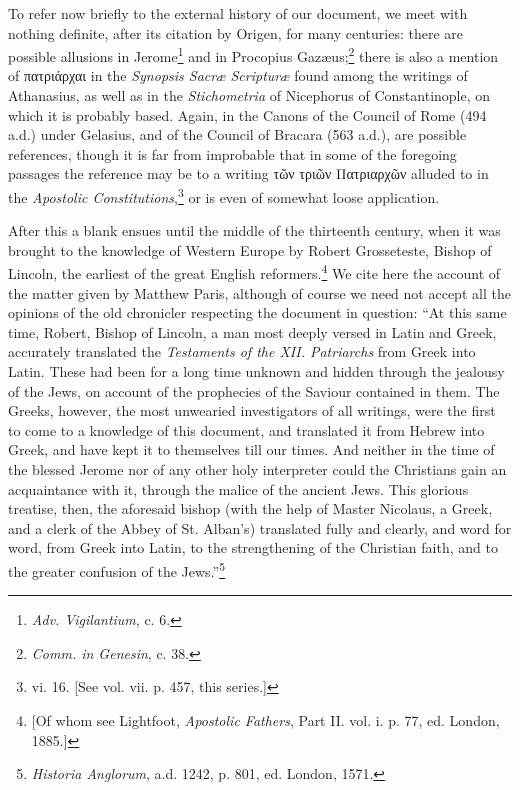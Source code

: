 To refer now briefly to the external history of our document, we meet with nothing definite, after its citation by Origen, for many centuries: there are possible allusions in Jerome\footnote{\emph{Adv. Vigilantium}, c. 6.} and in Procopius Gazæus;\footnote{\emph{Comm. in Genesin}, c. 38.} there is also a mention of \textgreek{πατριάρχαι} in the \emph{Synopsis Sacræ Scripturæ} found among the writings of Athanasius, as well as in the \emph{Stichometria} of Nicephorus of Constantinople, on which it is probably based. Again, in the Canons of the Council of Rome (494 a.d.) under Gelasius, and of the Council of Bracara (563 a.d.), are possible references, though it is far from improbable that in some of the foregoing passages the reference may be to a writing \textgreek{τῶν τριῶν Πατριαρχῶν} alluded to in the \emph{Apostolic Constitutions},\footnote{vi. 16. [See vol. vii. p. 457, this series.]} or is even of somewhat loose application.

After this a blank ensues until the middle of the thirteenth century, when it was brought to the knowledge of Western Europe by Robert Grosseteste, Bishop of Lincoln, the earliest of the great English reformers.\footnote{[Of whom see Lightfoot, \emph{Apostolic Fathers}, Part II. vol. i. p. 77, ed. London, 1885.]} We cite here the account of the matter given by Matthew Paris, although of course we need not accept all the opinions of the old chronicler respecting the document in question: “At this same time, Robert, Bishop of Lincoln, a man most deeply versed in Latin and Greek, accurately translated the \emph{Testaments of the XII. Patriarchs} from Greek into Latin. These had been for a long time unknown and hidden through the jealousy of the Jews, on account of the prophecies of the Saviour contained in them. The Greeks, however, the most unwearied investigators of all writings, were the first to come to a knowledge of this document, and translated it from Hebrew into Greek, and have kept it to themselves till our times. And neither in the time of the blessed Jerome nor of any other holy interpreter could the Christians gain an acquaintance with it, through the malice of the ancient Jews. This glorious treatise, then, the aforesaid bishop (with the help of Master Nicolaus, a Greek, and a clerk of the Abbey of St. Alban’s) translated fully and clearly, and word for word, from Greek into Latin, to the strengthening of the Christian faith, and to the greater confusion of the Jews.”\footnote{\emph{Historia Anglorum}, a.d. 1242, p. 801, ed. London, 1571.}


